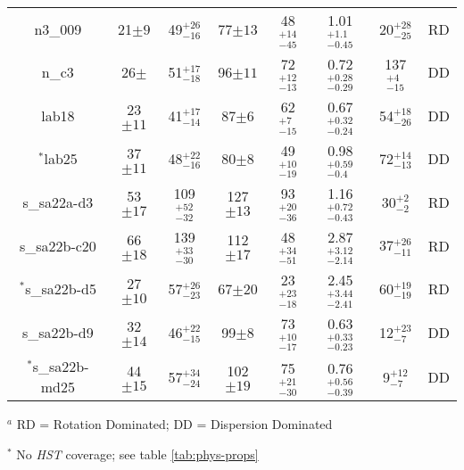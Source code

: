 \documentclass[fleqn,usenatbib]{mn2e}
\begin{document}
\begin{table*}
\begin{threeparttable}
\begin{tabular}{cccccccc}
n3\_009         & 21$\pm9$                    & 49$^{+26}_{-16}$                     & 77$\pm13$                  & 48$^{+14}_{-45}$          & 1.01$^{+1.1}_{-0.45}$                & 20$^{+28}_{-25}$  & RD   \\
n\_c3           & 26$\pm$                    & 51$^{+17}_{-18}$                     & 96$\pm11$                  & 72$^{+12}_{-13}$          & 0.72$^{+0.28}_{-0.29}$                & 137$^{+4}_{-15}$  & DD  \\
lab18           & 23$\pm11$                   & 41$^{+17}_{-14}$                     & 87$\pm6$                  & 62$^{+7}_{-15}$           & 0.67$^{+0.32}_{-0.24}$                 & 54$^{+18}_{-26}$ & DD    \\
$^{*}$lab25           & 37$\pm11$                    & 48$^{+22}_{-16}$                     & 80$\pm8$                  & 49$^{+10}_{-19}$          & 0.98$^{+0.59}_{-0.4}$                & 72$^{+14}_{-13}$ & DD   \\
s\_sa22a-d3     & 53$\pm17$                    & 109$^{+52}_{-32}$                    & 127$\pm13$                 & 93$^{+20}_{-36}$          & 1.16$^{+0.72}_{-0.43}$               & 30$^{+2}_{-2}$ & RD    \\
s\_sa22b-c20    & 66$\pm18$                    & 139$^{+33}_{-30}$                    & 112$\pm17$                 & 48$^{+34}_{-51}$          & 2.87$^{+3.12}_{-2.14}$                & 37$^{+26}_{-11}$ & RD   \\
$^{*}$s\_sa22b-d5     & 27$\pm10$                    & 57$^{+26}_{-23}$                     & 67$\pm20$                  & 23$^{+23}_{-18}$          & 2.45$^{+3.44}_{-2.41}$               & 60$^{+19}_{-19}$ & RD   \\
s\_sa22b-d9     & 32$\pm14$                    & 46$^{+22}_{-15}$                     & 99$\pm8$                  & 73$^{+10}_{-17}$             & 0.63$^{+0.33}_{-0.23}$                 & 12$^{+23}_{-7}$ & DD   \\
$^{*}$s\_sa22b-md25   & 44$\pm15$           & 57$^{+34}_{-24}$                     & 102$\pm19$   & 75$^{+21}_{-30}$                   & 0.76$^{+0.56}_{-0.39}$                & 9$^{+12}_{-7}$ & DD

\end{tabular}
\begin{tablenotes}
      \small
      \item $^{a}$ RD = Rotation Dominated; DD = Dispersion Dominated
      \item $^{*}$ No {\em HST} coverage; see table \ref{tab:phys-props}
    \end{tablenotes}
  \end{threeparttable}
  \end{table*}
\end{document}
